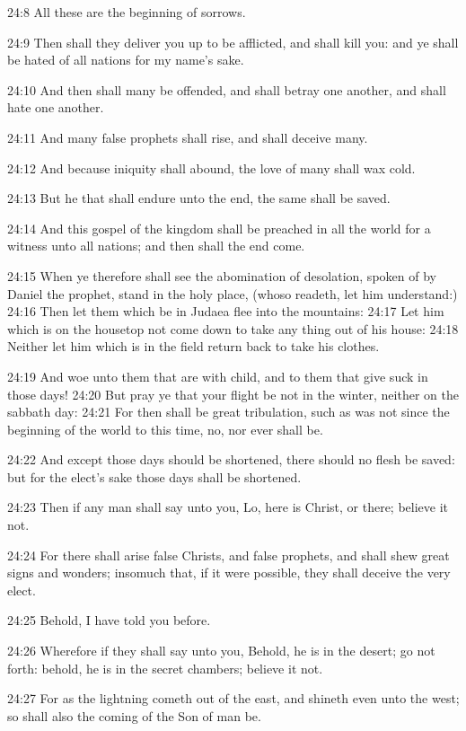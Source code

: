 24:8 All these are the beginning of sorrows.

24:9 Then shall they deliver you up to be afflicted, and shall kill
you: and ye shall be hated of all nations for my name's sake.

24:10 And then shall many be offended, and shall betray one another,
and shall hate one another.

24:11 And many false prophets shall rise, and shall deceive many.

24:12 And because iniquity shall abound, the love of many shall wax
cold.

24:13 But he that shall endure unto the end, the same shall be saved.

24:14 And this gospel of the kingdom shall be preached in all the
world for a witness unto all nations; and then shall the end come.

24:15 When ye therefore shall see the abomination of desolation,
spoken of by Daniel the prophet, stand in the holy place, (whoso
readeth, let him understand:) 24:16 Then let them which be in Judaea
flee into the mountains: 24:17 Let him which is on the housetop not
come down to take any thing out of his house: 24:18 Neither let him
which is in the field return back to take his clothes.

24:19 And woe unto them that are with child, and to them that give
suck in those days!  24:20 But pray ye that your flight be not in the
winter, neither on the sabbath day: 24:21 For then shall be great
tribulation, such as was not since the beginning of the world to this
time, no, nor ever shall be.

24:22 And except those days should be shortened, there should no flesh
be saved: but for the elect's sake those days shall be shortened.

24:23 Then if any man shall say unto you, Lo, here is Christ, or
there; believe it not.

24:24 For there shall arise false Christs, and false prophets, and
shall shew great signs and wonders; insomuch that, if it were
possible, they shall deceive the very elect.

24:25 Behold, I have told you before.

24:26 Wherefore if they shall say unto you, Behold, he is in the
desert; go not forth: behold, he is in the secret chambers; believe it
not.

24:27 For as the lightning cometh out of the east, and shineth even
unto the west; so shall also the coming of the Son of man be.

